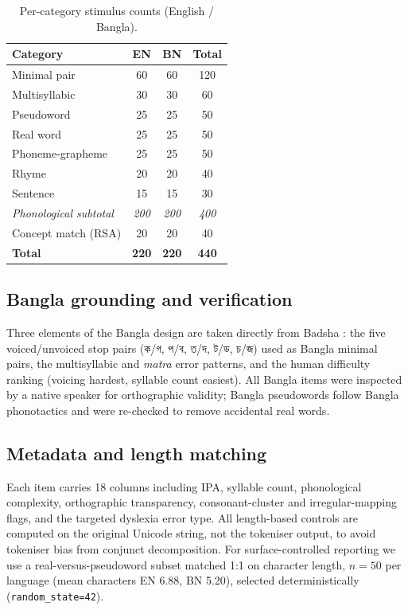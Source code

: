 \documentclass[conference]{IEEEtran}
\newcommand{\bn}[1]{{\banglafont #1}}
\begin{document}
\begin{table}[t]
\caption{Per-category stimulus counts (English / Bangla).}
\label{tab:data}
\centering
\small
\setlength{\tabcolsep}{3.5pt}
\begin{tabular}{lccc}
\toprule
\textbf{Category} & \textbf{EN} & \textbf{BN} & \textbf{Total} \\
\midrule
Minimal pair        & 60 & 60 & 120 \\
Multisyllabic       & 30 & 30 & 60 \\
Pseudoword          & 25 & 25 & 50 \\
Real word           & 25 & 25 & 50 \\
Phoneme-grapheme    & 25 & 25 & 50 \\
Rhyme               & 20 & 20 & 40 \\
Sentence            & 15 & 15 & 30 \\
\textit{Phonological subtotal} & \textit{200} & \textit{200} & \textit{400} \\
Concept match (RSA) & 20 & 20 & 40 \\
\midrule
\textbf{Total}      & \textbf{220} & \textbf{220} & \textbf{440} \\
\bottomrule
\end{tabular}
\end{table}

\subsection{Bangla grounding and verification}
Three elements of the Bangla design are taken directly from Badsha \cite{badsha2024mall}: the five voiced/unvoiced stop pairs (\bn{ক/গ}, \bn{প/ব}, \bn{ত/দ}, \bn{ট/ড}, \bn{চ/জ}) used as Bangla minimal pairs, the multisyllabic and \textit{matra} error patterns, and the human difficulty ranking (voicing hardest, syllable count easiest). All Bangla items were inspected by a native speaker for orthographic validity; Bangla pseudowords follow Bangla phonotactics and were re-checked to remove accidental real words.

\subsection{Metadata and length matching}
Each item carries 18 columns including IPA, syllable count, phonological complexity, orthographic transparency, consonant-cluster and irregular-mapping flags, and the targeted dyslexia error type. All length-based controls are computed on the original Unicode string, not the tokeniser output, to avoid tokeniser bias from conjunct decomposition. For surface-controlled reporting we use a real-versus-pseudoword subset matched 1:1 on character length, $n=50$ per language (mean characters EN 6.88, BN 5.20), selected deterministically (\texttt{random\_state=42}).
\end{document}
